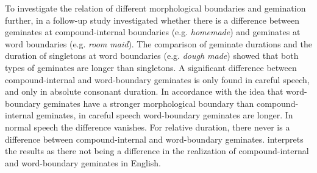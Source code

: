 To investigate the relation of different morphological boundaries and gemination further, in a follow-up study \cite{Oh.2013} investigated whether there is a difference between geminates at compound-internal boundaries (e.g. \textit{homemade}) and geminates at word boundaries (e.g. \textit{room maid}). The comparison of geminate durations and the duration of singletons at word boundaries (e.g. \textit{dough made}) showed that both types of geminates are longer than singletons. A significant difference between compound-internal and word-boundary geminates is only found in careful speech, and only in absolute consonant duration. In accordance with the idea that word-boundary geminates have a stronger morphological boundary than compound-internal geminates,  in careful speech word-boundary geminates are longer. In normal speech the difference vanishes. For relative duration, there never is a difference between compound-internal and word-boundary geminates. \cite{Oh.2013} interprets the results as there not being a difference in the realization of compound-internal and word-boundary geminates in English. 


